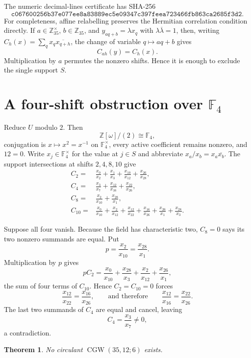 \documentclass[10pt]{article}
\newtheorem{theorem}{Theorem}
\newcommand{\F}{\mathbb F}
\newcommand{\Z}{\mathbb Z}
\newcommand{\CGW}{\operatorname{CGW}}
\begin{document}
The numeric decimal-lines certificate has SHA-256
\[
\texttt{c067600256b37e077ee8a83889ec5e09347c397feea723466fb863ca2685f3d2}.
\]
For completeness, affine relabelling preserves the Hermitian correlation
condition directly.  If $a\in\Z_{35}^{\times}$, $b\in\Z_{35}$, and
$y_{aq+b}=\lambda x_q$ with $\lambda\overline{\lambda}=1$, then, writing
$C_h(x)=\sum_qx_q\overline{x_{q+h}}$, the change of variable
$q\mapsto aq+b$ gives
\[
 C_{ah}(y)=C_h(x).
\]
Multiplication by $a$ permutes the nonzero shifts.  Hence it is enough to
exclude the single support $S$.

\section{A four-shift obstruction over \texorpdfstring{$\F_4$}{F4}}

Reduce $U$ modulo $2$.  Then
\[
 \Z[\omega]/(2)\cong\F_4,
\]
conjugation is $x\mapsto x^2=x^{-1}$ on $\F_4^\times$, every active
coefficient remains nonzero, and $12=0$.  Write
$x_j\in\F_4^\times$ for the value at $j\in S$ and abbreviate
$x_a/x_b=x_a\overline{x_b}$.  The support intersections at shifts
$2,4,8,10$ give
\[
\begin{aligned}
C_2={}&\frac{x_0}{x_2}+\frac{x_1}{x_3}
      +\frac{x_{10}}{x_{12}}+\frac{x_{26}}{x_{28}},\\
C_4={}&\frac{x_3}{x_7}+\frac{x_{12}}{x_{16}}
      +\frac{x_{22}}{x_{26}},\\
C_8={}&\frac{x_2}{x_{10}}+\frac{x_{28}}{x_1},\\
C_{10}={}&\frac{x_0}{x_{10}}+\frac{x_2}{x_{12}}
      +\frac{x_{12}}{x_{22}}+\frac{x_{16}}{x_{26}}
      +\frac{x_{26}}{x_1}+\frac{x_{28}}{x_3}.
\end{aligned}
\]

Suppose all four vanish.  Because the field has characteristic two,
$C_8=0$ says its two nonzero summands are equal.  Put
\[
 p=\frac{x_2}{x_{10}}=\frac{x_{28}}{x_1}.
\]
Multiplication by $p$ gives
\[
 pC_2=
 \frac{x_0}{x_{10}}+\frac{x_{28}}{x_3}
 +\frac{x_2}{x_{12}}+\frac{x_{26}}{x_1},
\]
the sum of four terms of $C_{10}$.  Hence $C_2=C_{10}=0$ forces
\[
 \frac{x_{12}}{x_{22}}=\frac{x_{16}}{x_{26}},
 \qquad\text{and therefore}\qquad
 \frac{x_{12}}{x_{16}}=\frac{x_{22}}{x_{26}}.
\]
The last two summands of $C_4$ are equal and cancel, leaving
\[
 C_4=\frac{x_3}{x_7}\ne0,
\]
a contradiction.

\begin{theorem}\label{thm:cgw}
No circulant $\CGW(35,12;6)$ exists.
\end{theorem}
\end{document}
